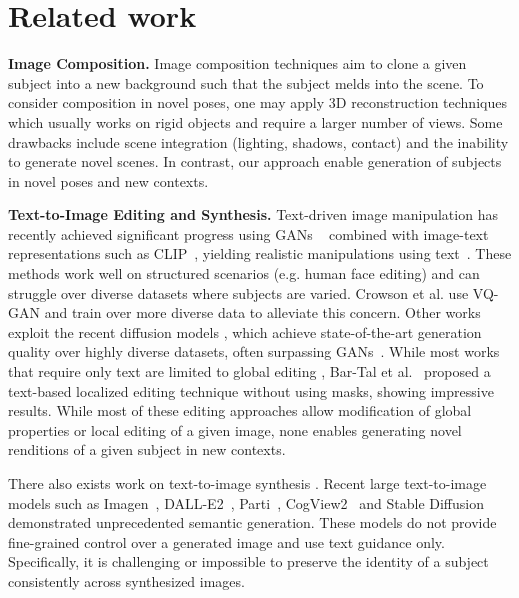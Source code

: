 \section{Related work}

\textbf{Image Composition. }
Image composition techniques \cite{wu2019gp,cong2020dovenet,lin2018st} aim to clone a given subject into a new background such that the subject melds into the scene. To consider composition in novel poses, one may apply 3D reconstruction techniques \cite{mildenhall2020nerf,Barron_2021_ICCV,boss2022samurai,verbin2021refnerf,poole2022dreamfusion} which usually works on rigid objects and require a larger number of views. Some drawbacks include scene integration (lighting, shadows, contact) and the inability to generate novel scenes. In contrast, our approach enable generation of subjects in novel poses and new contexts.

\textbf{Text-to-Image Editing and Synthesis. }
Text-driven image manipulation has recently achieved significant progress using GANs
~\cite{goodfellow2014generative,brock2018large,karras2021alias,karras2019style,karras2020analyzing} combined with image-text representations such as CLIP~\cite{radford2021learning}, yielding realistic manipulations using text~\cite{patashnik2021styleclip,gal2021stylegan, xia2021tedigan, abdal2021clip2stylegan,bau2021paint,mokady2022self}.
These methods work well on structured scenarios (e.g. human face editing) and can struggle over diverse datasets where subjects are varied.
Crowson et al. \cite{crowson2022vqgan} use VQ-GAN \cite{esser2021taming} and train over more diverse data to alleviate this concern.
Other works~\cite{avrahami2022blended, kim2022diffusionclip} exploit the recent diffusion models \cite{ho2020denoising,sohl2015deep,song2019generative,ho2020denoising,song2020denoising,rombach2021highresolution,nichol2021improved,song2020improved,palette,saharia2021image}, which achieve state-of-the-art generation quality over highly diverse datasets, often surpassing GANs~\cite{dhariwal2021diffusion}.
While most works that require only text are limited to global editing \cite{crowson2022vqgan, kwon2021clipstyler}, 
Bar-Tal et al.~\cite{bar2022text2live} proposed a text-based localized editing technique without using masks, showing impressive results. While most of these editing approaches allow modification of global properties or local editing of a given image, none enables generating novel renditions of a given subject in new contexts.

There also exists work on text-to-image synthesis \cite{ding2021cogview,hinz2020semantic,tao2020df, li2019controllable,li2019object,qiao2019learn,qiao2019mirrorgan,ramesh2021zero,zhang2018photographic,crowson2022vqgan, gafni2022make, rombach2021highresolution,jain2021dreamfields}. Recent large text-to-image models such as Imagen~\cite{saharia2022photorealistic}, DALL-E2~\cite{ramesh2022hierarchical}, Parti~\cite{yu2022scaling}, CogView2~\cite{ding2022cogview2} and Stable Diffusion~\cite{rombach2021highresolution} demonstrated unprecedented semantic generation. These models do not provide fine-grained control over a generated image and use text guidance only.
Specifically, it is challenging or impossible to preserve the identity of a subject consistently across synthesized images.

